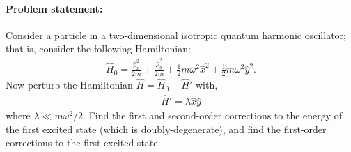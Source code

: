 \documentclass[10pt]{article}
\newcommand{\1}{\mathbf 1}
\begin{document}






\paragraph{Problem statement:}
Consider a particle in a two-dimensional isotropic quantum harmonic oscillator; that is, consider the following Hamiltonian:
\begin{align}
	\hat H_0
	=
	\frac{\hat p_x^2}{2m}
	+
	\frac{\hat p_y^2}{2m}
	+
	\frac{1}{2} m \omega^2 \hat x^2
	+
	\frac{1}{2} m \omega^2 \hat y^2.
\end{align}
Now perturb the Hamiltonian $\hat H = \hat H_0 + \hat H'$ with,
\begin{align}
	\hat H' = \lambda \hat x \hat y
\end{align}
where $\lambda \ll m \omega^2/2$.
Find the first and second-order corrections to the energy of the first excited state (which is doubly-degenerate), and find the first-order corrections to the first excited state.
\end{document}
